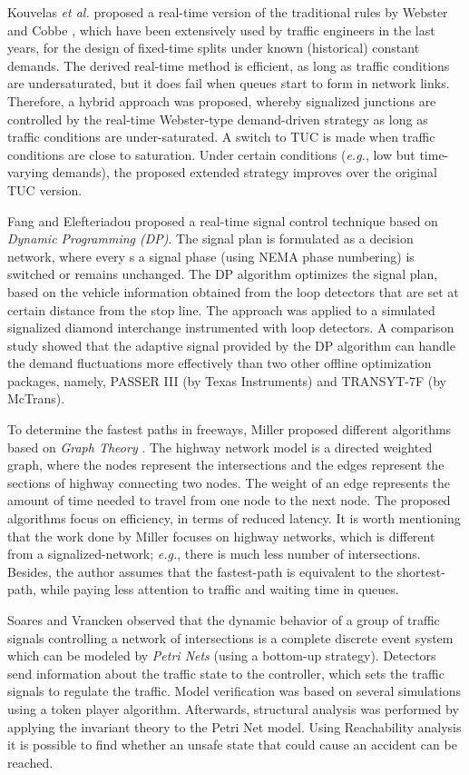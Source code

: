 \documentclass[10pt,onecolumn]{article}
\begin{document}
Kouvelas \textit{et al.} \cite{Kouvelas2011} proposed a real-time version of the traditional rules by Webster and Cobbe \cite{Webster1966}, which have been extensively used by traffic engineers in the last
 years, for the design of fixed-time splits under known (historical) constant demands. The derived real-time method is efficient, as long as traffic conditions are undersaturated, but it does fail when queues start to form in network links. Therefore, a hybrid approach was proposed, whereby signalized junctions are controlled by the real-time Webster-type demand-driven strategy as long as traffic conditions are under-saturated. A switch to TUC is made when traffic conditions are close to saturation. Under certain conditions (\textit{e.g.}, low but time-varying demands), the proposed extended strategy improves over the original TUC version.


Fang and Elefteriadou \cite{Fang2008} proposed a real-time signal control technique based on \textit{Dynamic Programming (DP)}. The signal plan is formulated as a decision network, where every s a signal phase (using NEMA phase numbering) is switched or remains unchanged.
The DP algorithm optimizes the signal plan, based on the vehicle information obtained from the loop detectors that are set at certain distance from the stop line. 
The approach was applied to a simulated signalized diamond interchange instrumented with loop detectors. A comparison study showed that the adaptive signal provided by the DP algorithm can handle the demand fluctuations more effectively than two other offline optimization packages, namely, PASSER III (by Texas Instruments) and TRANSYT-7F (by McTrans).

To determine the fastest paths in freeways, Miller proposed different algorithms based on \textit{Graph Theory} \cite{Miller2009}. 
The highway network model is a directed weighted graph, where the nodes represent the intersections and the edges represent the sections of highway connecting two nodes. The weight of an edge represents the amount of time needed to travel from one node to the next node. 
The proposed algorithms focus on efficiency, in terms of reduced latency. 
It is worth mentioning that the work done by Miller focuses on highway networks, which is different from a signalized-network; \textit{e.g.}, there is much less number of intersections. Besides, the author assumes that the fastest-path is equivalent to the shortest-path, while paying less attention to traffic and waiting time in queues.

Soares and Vrancken \cite{Soares2012} observed that the dynamic behavior of a group of traffic signals controlling a network of intersections is a complete discrete event system which can be modeled by \textit{Petri Nets} (using a bottom-up strategy).  
Detectors send information about the traffic state to the controller, which sets the traffic signals to regulate the traffic. 
Model verification was based on several simulations using a token player algorithm. Afterwards, structural analysis was performed by applying the invariant theory to the Petri Net model.
Using Reachability analysis it is possible to find whether an unsafe state that could cause an accident can be reached.
\end{document}
